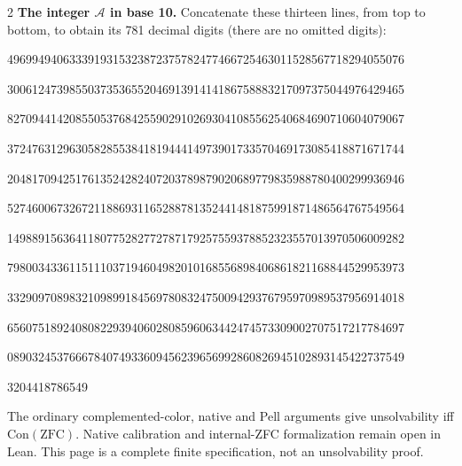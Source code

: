\documentclass[10pt]{article}
\begin{document}
\begin{multicols}{2}
\textbf{The integer $\mathcal A$ in base 10.}
Concatenate these thirteen lines, from top to bottom, to obtain its
781 decimal digits (there are no omitted digits):\par
\begingroup\fontsize{7.7}{8.2}\selectfont{}\par
4969949406333919315323872375782477466725463011528567718294055076\par
3006124739855037353655204691391414186758883217097375044976429465\par
8270944142085505376842559029102693041085562540684690710604079067\par
3724763129630582855384181944414973901733570469173085418871671744\par
2048170942517613524282407203789879020689779835988780400299936946\par
5274600673267211886931165288781352441481875991871486564767549564\par
1498891563641180775282772787179257559378852323557013970506009282\par
7980034336115111037194604982010168556898406861821168844529953973\par
3329097089832109899184569780832475009429376795970989537956914018\par
6560751892408082293940602808596063442474573309002707517217784697\par
0890324537666784074933609456239656992860826945102893145422737549\par
3204418786549\par
\endgroup
\normalfont\fontsize{7.7}{8.2}\selectfont
The ordinary complemented-color, native and Pell arguments give
unsolvability iff $\mathrm{Con}(\mathrm{ZFC})$.
Native calibration and internal-ZFC formalization remain open in Lean.
This page is a complete finite specification, not an unsolvability proof.
\end{multicols}
\end{document}
